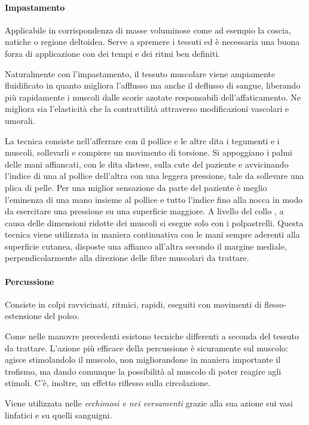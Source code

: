 \paragraph{Impastamento}


Applicabile in corrispondenza di masse voluminose come ad esempio la
coscia, natiche o regione deltoidea. Serve a spremere i tessuti ed è
necessaria una buona forza di applicazione con dei tempi e dei ritmi ben
definiti.

Naturalmente con l'impastamento, il tessuto muscolare viene ampiamente
fluidificato in quanto migliora l'afflusso ma anche il deflusso di
sangue, liberando più rapidamente i muscoli dalle scorie azotate
responsabili dell'affaticamento. Ne migliora sia l'elasticità che la
contrattilità attraverso modificazioni vascolari e umorali.

La tecnica consiste nell'afferrare con il pollice e le altre dita i
tegumenti e i muscoli, sollevarli e compiere un movimento di torsione.
Si appoggiano i palmi delle mani affiancati, con le dita distese, sulla
cute del paziente e avvicinando l'indice di una al pollice dell'altra
con una leggera pressione, tale da sollevare una plica di pelle. Per una
miglior sensazione da parte del paziente è meglio l'eminenza di una mano
insieme al pollice e tutto l'indice fino alla nocca in modo da
esercitare una pressione su una superficie maggiore. A livello del collo
, a causa delle dimensioni ridotte dei muscoli si esegue solo con i
polpastrelli. Questa tecnica viene utilizzata in maniera continuativa
con le mani sempre aderenti alla superficie cutanea, disposte una
affianco all'altra secondo il margine mediale, perpendicolarmente alla
direzione delle fibre muscolari da trattare.
\paragraph{Percussione}


Consiste in colpi ravvicinati, ritmici, rapidi, eseguiti con movimenti
di flesso-estensione del polso.

Come nelle manovre precedenti esistono tecniche differenti a seconda del
tessuto da trattare. L'azione più efficace della percussione è
sicuramente sul muscolo: agisce stimolandolo il muscolo, non
migliorandone in maniera importante il trofismo, ma dando comunque la
possibilità al muscolo di poter reagire agli stimoli. C'è, inoltre, un
effetto riflesso sulla circolazione.

Viene utilizzata nelle \emph{ecchimosi e nei versamenti} grazie alla sua
azione sui vasi linfatici e su quelli sanguigni.

